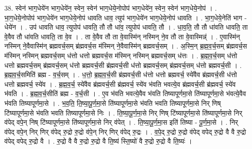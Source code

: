 \documentclass[17pt]{extarticle}
\begin{document}
38. स्वेन॑ भाग॒धेये॑न भाग॒धेये॑न॒ स्वेन॒ स्वेन॑ भाग॒धेये॒नोपोप॑ भाग॒धेये॑न॒ स्वेन॒ स्वेन॑ भाग॒धेये॒नोप॑ । . भा॒ग॒धेये॒नोपोप॑ भाग॒धेये॑न भाग॒धेये॒नोप॑ धावति धाव॒ त्युप॑ भाग॒धेये॑न भाग॒धेये॒नोप॑ धावति । . भा॒ग॒धेये॒नेति॑ भाग - धेये॑न । . उप॑ धावति धाव॒ त्युपोप॑ धावति॒ तौ तौ धा॑व॒ त्युपोप॑ धावति॒ तौ । . धा॒व॒ति॒ तौ तौ धा॑वति धावति॒ ता वे॒वैव तौ धा॑वति धावति॒ ता वे॒व । . ता वे॒वैव तौ ता वे॒वास्मि॑न् नस्मिन् ने॒व तौ ता वे॒वास्मिन्न्॑ । . ए॒वास्मि॑न् नस्मिन् ने॒वैवास्मि॑न् ब्रह्मवर्च॒सम् ब्र॑ह्मवर्च॒स म॑स्मिन् ने॒वैवास्मि॑न् ब्रह्मवर्च॒सम् । . अ॒स्मि॒न् ब्र॒ह्म॒व॒र्च॒सम् ब्र॑ह्मवर्च॒स म॑स्मिन् नस्मिन् ब्रह्मवर्च॒सम् ध॑त्तो धत्तो ब्रह्मवर्च॒स म॑स्मिन् नस्मिन् ब्रह्मवर्च॒सम् ध॑त्तः । . ब्र॒ह्म॒व॒र्च॒सम् ध॑त्तो धत्तो ब्रह्मवर्च॒सम् ब्र॑ह्मवर्च॒सम् ध॑त्तो ब्रह्मवर्च॒सी ब्र॑ह्मवर्च॒सी ध॑त्तो ब्रह्मवर्च॒सम् ब्र॑ह्मवर्च॒सम् ध॑त्तो ब्रह्मवर्च॒सी । . ब्र॒ह्म॒व॒र्च॒समिति॑ ब्रह्म - व॒र्च॒सम् । . ध॒त्तो॒ ब्र॒ह्म॒व॒र्च॒सी ब्र॑ह्मवर्च॒सी ध॑त्तो धत्तो ब्रह्मवर्च॒ स्ये॑वैव ब्र॑ह्मवर्च॒सी ध॑त्तो धत्तो ब्रह्मवर्च॒ स्ये॑व । . ब्र॒ह्म॒व॒र्च॒ स्ये॑वैव ब्र॑ह्मवर्च॒सी ब्र॑ह्मवर्च॒ स्ये॑व भ॑वति भवत्ये॒व ब्र॑ह्मवर्च॒सी ब्र॑ह्मवर्च॒ स्ये॑व भ॑वति । . ब्र॒ह्म॒व॒र्च॒सीति॑ ब्रह्म - व॒र्च॒सी । . ए॒व भ॑वति भवत्ये॒वैव भ॑वति तिष्यापूर्णमा॒से ति॑ष्यापूर्णमा॒से भ॑वत्ये॒वैव भ॑वति तिष्यापूर्णमा॒से । . भ॒व॒ति॒ ति॒ष्या॒पू॒र्ण॒मा॒से ति॑ष्यापूर्णमा॒से भ॑वति भवति तिष्यापूर्णमा॒से निर् णिष् टि॑ष्यापूर्णमा॒से भ॑वति भवति तिष्यापूर्णमा॒से निः । . ति॒ष्या॒पू॒र्ण॒मा॒से निर् णिष् टि॑ष्यापूर्णमा॒से ति॑ष्यापूर्णमा॒से निर् व॑पेद् वपे॒न् निष् टि॑ष्यापूर्णमा॒से ति॑ष्यापूर्णमा॒से निर् व॑पेत् । . ति॒ष्या॒पू॒र्ण॒मा॒स इति॑ तिष्या - पू॒र्ण॒मा॒से । . निर् व॑पेद् वपे॒न् निर् णिर् व॑पेद् रु॒द्रो रु॒द्रो व॑पे॒न् निर् णिर् व॑पेद् रु॒द्रः । . व॒पे॒द् रु॒द्रो रु॒द्रो व॑पेद् वपेद् रु॒द्रो वै वै रु॒द्रो व॑पेद् वपेद् रु॒द्रो वै । . रु॒द्रो वै वै रु॒द्रो रु॒द्रो वै ति॒ष्य॑ स्ति॒ष्यो॑ वै रु॒द्रो रु॒द्रो वै ति॒ष्यः॑ । \newline
\pagebreak
{}
\end{document}

